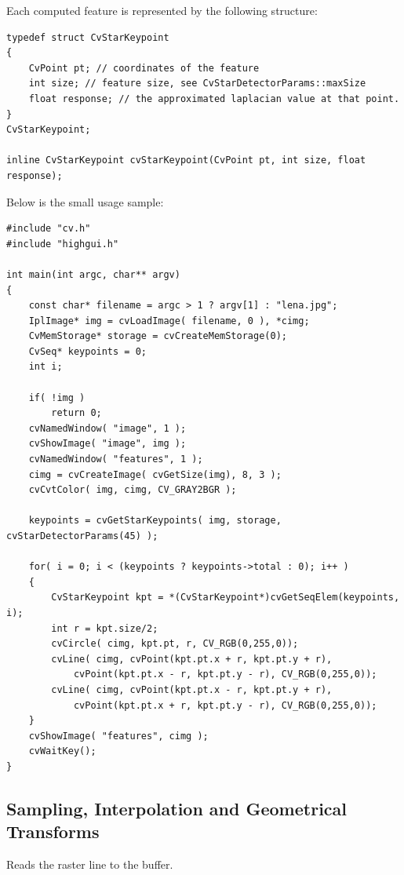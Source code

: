 Each computed feature is represented by the following structure:

\begin{lstlisting}
typedef struct CvStarKeypoint
{
    CvPoint pt; // coordinates of the feature
    int size; // feature size, see CvStarDetectorParams::maxSize
    float response; // the approximated laplacian value at that point.
}
CvStarKeypoint;

inline CvStarKeypoint cvStarKeypoint(CvPoint pt, int size, float response);
\end{lstlisting}

Below is the small usage sample:

\begin{lstlisting}
#include "cv.h"
#include "highgui.h"

int main(int argc, char** argv)
{
    const char* filename = argc > 1 ? argv[1] : "lena.jpg";
    IplImage* img = cvLoadImage( filename, 0 ), *cimg;
    CvMemStorage* storage = cvCreateMemStorage(0);
    CvSeq* keypoints = 0;
    int i;

    if( !img )
        return 0;
    cvNamedWindow( "image", 1 );
    cvShowImage( "image", img );
    cvNamedWindow( "features", 1 );
    cimg = cvCreateImage( cvGetSize(img), 8, 3 );
    cvCvtColor( img, cimg, CV_GRAY2BGR );

    keypoints = cvGetStarKeypoints( img, storage, cvStarDetectorParams(45) );

    for( i = 0; i < (keypoints ? keypoints->total : 0); i++ )
    {
        CvStarKeypoint kpt = *(CvStarKeypoint*)cvGetSeqElem(keypoints, i);
        int r = kpt.size/2;
        cvCircle( cimg, kpt.pt, r, CV_RGB(0,255,0));
        cvLine( cimg, cvPoint(kpt.pt.x + r, kpt.pt.y + r),
            cvPoint(kpt.pt.x - r, kpt.pt.y - r), CV_RGB(0,255,0));
        cvLine( cimg, cvPoint(kpt.pt.x - r, kpt.pt.y + r),
            cvPoint(kpt.pt.x + r, kpt.pt.y - r), CV_RGB(0,255,0));
    }
    cvShowImage( "features", cimg );
    cvWaitKey();
}
\end{lstlisting}

\subsection{Sampling, Interpolation and Geometrical Transforms}

\ifC
{}\label{SampleLine}
Reads the raster line to the buffer.


